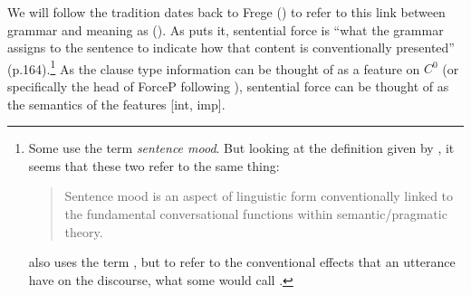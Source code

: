 We will follow the tradition dates back to Frege (\cite{frege1918thought}) to refer to this link between grammar and meaning as  (\cite{chierchia1990textbook}). As \textcite{chierchia1990textbook} puts it, sentential force is ``what the grammar assigns to the sentence to indicate how that content is conventionally presented'' (p.164).\footnote{Some use the term \emph{sentence mood}. But looking at the definition given by \textcite{portner2018}, it seems that these two refer to the same thing:
\begin{quote}
Sentence mood is an aspect of linguistic form conventionally linked to the fundamental conversational functions within semantic/pragmatic theory.\\
\hspace*{\fill} \hfill \textcite[p.122]{portner2018}
\end{quote}
\cite{portner2018} also uses the term , but to refer to the conventional effects that an utterance have on the discourse, what some would call . 
} As the clause type information can be thought of as a feature on $C^{0}$ (or specifically the head of ForceP following \cite{rizzi1997}), sentential force can be thought of as the semantics of the features [\textpm int, \textpm imp].


